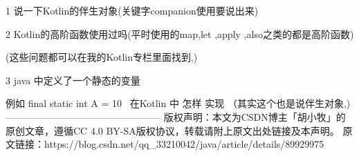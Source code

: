 1 说一下Kotlin的伴生对象(关键字companion使用要说出来)

2 Kotlin的高阶函数使用过吗(平时使用的map,let ,apply ,also之类的都是高阶函数)

(这些问题都可以在我的Kotlin专栏里面找到,)

3 java 中定义了一个静态的变量

例如 final static int A = 10  在Kotlin 中 怎样 实现 （其实这个也是说伴生对象,)
————————————————
版权声明：本文为CSDN博主「胡小牧」的原创文章，遵循CC 4.0 BY-SA版权协议，转载请附上原文出处链接及本声明。
原文链接：https://blog.csdn.net/qq_33210042/java/article/details/89929975
